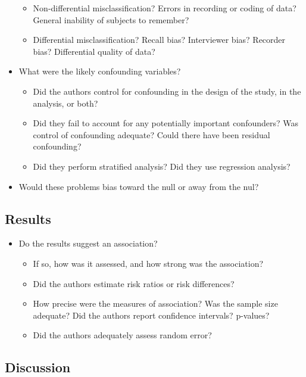 \documentclass[]{book}
\providecommand{\tightlist}{%
  \setlength{\itemsep}{0pt}\setlength{\parskip}{0pt}}
\begin{document}
\begin{itemize}
  \begin{itemize}
  \tightlist
  \item
    Non-differential misclassification? Errors in recording or coding of data? General inability of subjects to remember?
  \item
    Differential misclassification? Recall bias? Interviewer bias? Recorder bias? Differential quality of data?
  \end{itemize}
\item
  What were the likely confounding variables?

  \begin{itemize}
  \tightlist
  \item
    Did the authors control for confounding in the design of the study, in the analysis, or both?
  \item
    Did they fail to account for any potentially important confounders? Was control of confounding adequate? Could there have been residual confounding?
  \item
    Did they perform stratified analysis? Did they use regression analysis?
  \end{itemize}
\item
  Would these problems bias toward the null or away from the nul?
\end{itemize}

\hypertarget{results}{%
\subsection{Results}\label{results}}

\begin{itemize}
\tightlist
\item
  Do the results suggest an association?

  \begin{itemize}
  \tightlist
  \item
    If so, how was it assessed, and how strong was the association?
  \item
    Did the authors estimate risk ratios or risk differences?
  \item
    How precise were the measures of association? Was the sample size adequate? Did the authors report confidence intervals? p-values?
  \item
    Did the authors adequately assess random error?
  \end{itemize}
\end{itemize}

\hypertarget{discussion}{%
\subsection{Discussion}\label{discussion}}
\end{document}
